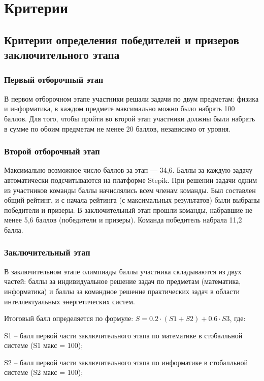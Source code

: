 \part{Критерии}

\chapter{Критерии определения победителей и призеров заключительного этапа}

\section{Первый отборочный этап}

В первом отборочном этапе участники решали задачи по двум предметам: физика и информатика, в каждом предмете максимально можно было набрать 100 баллов. Для того, чтобы пройти во второй этап участники должны были набрать в сумме по обоим предметам не менее 20 баллов, независимо от уровня.

\section{Второй отборочный этап}

Максимально возможное число баллов за этап — 34,6. Баллы за каждую задачу автоматически подсчитываются на платформе Stepik. При решении задачи одним из участников команды баллы начислялись всем членам команды. Был составлен общий рейтинг, и с начала рейтинга (с максимальных результатов) были выбраны победители и призеры. В заключительный этап прошли команды, набравшие не менее 5,6 баллов (победители и призеры). Команда победитель набрала 11,2 балла.   

\section{Заключительный этап}

В заключительном этапе олимпиады баллы участника складываются из двух частей: баллы за индивидуальное решение задач по предметам (математика, информатика) и баллы за командное решение практических задач в области интеллектуальных энергетических систем.

Итоговый балл определяется по формуле: $S = 0.2 \cdot  (S1+S2) + 0.6 \cdot S3$, где:

S1 – балл первой части заключительного этапа по математике в стобалльной системе (S1 макс = 100);

S2 – балл первой части заключительного этапа по информатике в стобалльной системе (S2 макс = 100);

